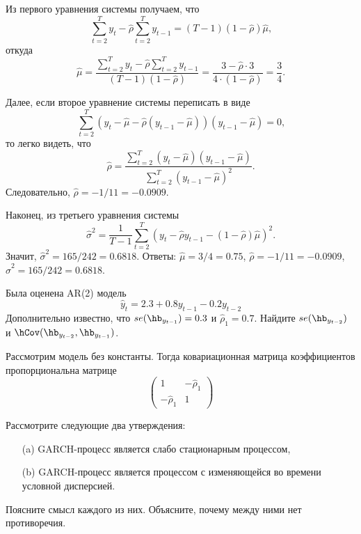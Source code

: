 \begin{solution}
Из первого уравнения системы получаем, что
\[
\sum_{t=2}^{T}y_{t} - \hat{\rho} \sum_{t=2}^{T}y_{t-1} = (T - 1) (1- \hat{\rho}) \hat{\mu} \text{,}
\]
откуда
\[
\hat{\mu} = \frac{\sum_{t=2}^{T}y_{t} - \hat{\rho} \sum_{t=2}^{T}y_{t-1}}{(T - 1) (1- \hat{\rho})} = \frac{3 - \hat{\rho} \cdot 3}{4\cdot(1-\hat{\rho})} = \frac{3}{4} \text{.}
\]

Далее, если второе уравнение системы переписать в виде
\[
\sum_{t=2}^{T}(y_t - \hat{\mu} - \hat{\rho} (y_{t-1} - \hat{\mu}))(y_{t-1} - \hat{\mu}) = 0 \text{,}
\]
то легко видеть, что
\[
\hat{\rho} = \frac{\sum_{t=2}^{T}(y_t - \hat{\mu})(y_{t-1} - \hat{\mu})}{\sum_{t=2}^{T}(y_{t-1} - \hat{\mu})^2} \text{.}
\]
Следовательно, $\hat{\rho} =-1/11= -0.0909$.

Наконец, из третьего уравнения системы
\[
\hat{\sigma}^2 =\frac{1}{T-1} \sum_{t=2}^{T}(y_t - \hat{\rho} y_{t-1} - (1 - \hat{\rho}) \hat{\mu})^2 \text{.}
\]
Значит, $\hat{\sigma}^2 = 165/242= 0.6818$. Ответы: $\hat{\mu} = 3/4= 0.75$, $\hat{\rho} = -1/11=-0.0909$, $\hat{\sigma}^2 =165/242=0.6818$.
\end{solution}


\begin{problem}
Была оценена AR(2) модель
\[
\hat{y}_t=2.3+0.8 y_{t-1}-0.2 y_{t-2}
\]
Дополнительно известно, что $se(\hb_{y_{t-1}})=0.3$ и $\hat{\rho}_1=0.7$. Найдите $se(\hb_{y_{t-2}})$ и $\hCov(\hb_{y_{t-2}},\hb_{y_{t-1}})$.
\end{problem}

\begin{solution}
Рассмотрим модель без константы. Тогда ковариационная матрица коэффициентов пропорциональна матрице
\[
\begin{pmatrix}
1 & -\hat{\rho}_1 \\
-\hat{\rho}_1 & 1
\end{pmatrix}
\]
\end{solution}



\begin{problem}
Рассмотрите следующие два утверждения:
\begin{itemize}
  \item[(a)] GARCH-процесс является слабо стационарным процессом,
  \item[(b)] GARCH-процесс является процессом с изменяющейся во времени условной дисперсией.
\end{itemize}
Поясните смысл каждого из них. Объясните, почему между ними нет противоречия.
\end{problem}

